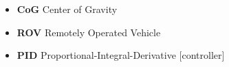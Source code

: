 
\begin{itemize}
    \item \textbf{CoG} Center of Gravity
    \item \textbf{ROV} Remotely Operated Vehicle
    \item \textbf{PID} Proportional-Integral-Derivative [controller]
    
\end{itemize}